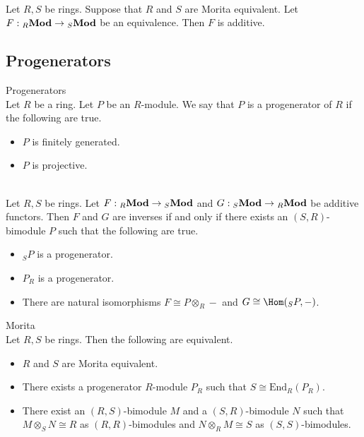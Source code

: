 \documentclass[a4paper]{article}
\begin{document}
\begin{lmm}{}{}\\
Let $R,S$ be rings. Suppose that $R$ and $S$ are Morita equivalent. Let $F:{_R}\bold{Mod}\to{_S}\bold{Mod}$ be an equivalence. Then $F$ is additive. 
\end{lmm}

\subsection{Progenerators}
\begin{defn}{Progenerators}{}\\
Let $R$ be a ring. Let $P$ be an $R$-module. We say that $P$ is a progenerator of $R$ if the following are true. 
\begin{itemize}
\item $P$ is finitely generated. 
\item $P$ is projective. 
\end{itemize}
\end{defn}

\begin{prp}{}{}\\
Let $R,S$ be rings. Let $F:{_R}\bold{Mod}\to{_S}\bold{Mod}$ and $G:{_S}\bold{Mod}\to{_R}\bold{Mod}$ be additive functors. Then $F$ and $G$ are inverses if and only if there exists an $(S,R)$-bimodule $P$ such that the following are true. 
\begin{itemize}
\item ${_S}P$ is a progenerator. 
\item $P_R$ is a progenerator. 
\item There are natural isomorphisms $F\cong P\otimes_R-$ and $G\cong\Hom({_S}P,-)$. 
\end{itemize}
\end{prp}

\begin{thm}{Morita}{}\\
Let $R,S$ be rings. Then the following are equivalent. 
\begin{itemize}
\item $R$ and $S$ are Morita equivalent. 
\item There exists a progenerator $R$-module $P_R$ such that $S\cong\text{End}_R(P_R)$. 
\item There exist an $(R,S)$-bimodule $M$ and a $(S,R)$-bimodule $N$ such that $M\otimes_SN\cong R$ as $(R,R)$-bimodules and $N\otimes_RM\cong S$ as $(S,S)$-bimodules. 
\end{itemize}
\end{thm}
\end{document}
